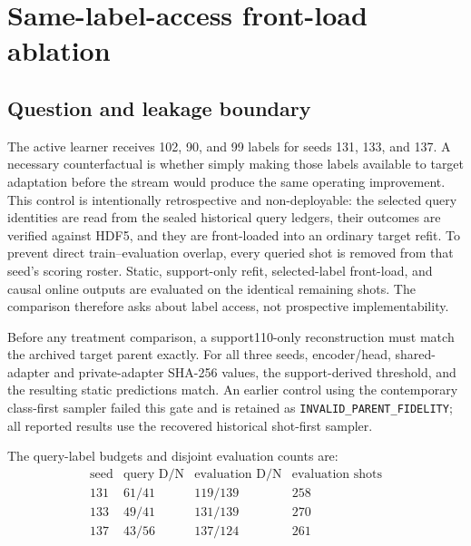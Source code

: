 \documentclass[10pt]{article}
\newcommand{\code}[1]{\nolinkurl{#1}}
\begin{document}
\section{Same-label-access front-load ablation}

\subsection{Question and leakage boundary}

The active learner receives 102, 90, and 99 labels for seeds 131, 133, and 137.  A necessary counterfactual is whether simply making those labels available to target adaptation before the stream would produce the same operating improvement.  This control is intentionally retrospective and non-deployable: the selected query identities are read from the sealed historical query ledgers, their outcomes are verified against HDF5, and they are front-loaded into an ordinary target refit.  To prevent direct train--evaluation overlap, every queried shot is removed from that seed's scoring roster.  Static, support-only refit, selected-label front-load, and causal online outputs are evaluated on the identical remaining shots.  The comparison therefore asks about label access, not prospective implementability.

Before any treatment comparison, a support110-only reconstruction must match the archived target parent exactly.  For all three seeds, encoder/head, shared-adapter and private-adapter SHA-256 values, the support-derived threshold, and the resulting static predictions match.  An earlier control using the contemporary class-first sampler failed this gate and is retained as \code{INVALID\_PARENT\_FIDELITY}; all reported results use the recovered historical shot-first sampler.

The query-label budgets and disjoint evaluation counts are:
\begin{equation}
\begin{array}{c|ccc}
\text{seed} & \text{query D/N} & \text{evaluation D/N} & \text{evaluation shots}\\
\hline
131 & 61/41 & 119/139 & 258\\
133 & 49/41 & 131/139 & 270\\
137 & 43/56 & 137/124 & 261
\end{array}
\end{equation}

\begin{landscape}
\begin{table}[p]
\centering
\small

\caption{Same-label-access counterfactual on query-label-disjoint complements.  ``Front-load'' adds the exact queried labels to target refitting; ``recal.'' reselects the threshold on support110.  The fixed archived parent threshold is primary.  TPR$_{30}$--FPR is an explicit balanced operating summary, not a clinical or control-system utility.}
\end{table}
\end{landscape}
\end{document}
